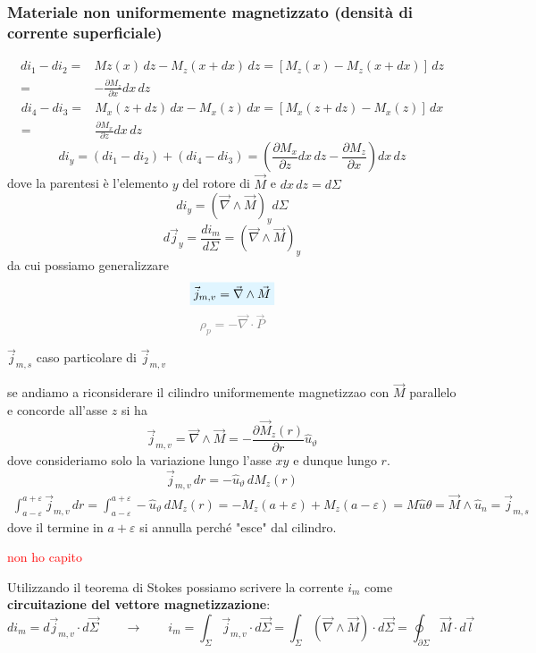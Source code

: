 \documentclass[x11names]{report}
\newcommand{\esempio}[2]{
	\begin{es}{#1}
		#2
	\end{es}
}
\newcommand{\viola}[1]{%
	\colorbox{myblue}{$\displaystyle #1$}
}
\begin{document}
\subsubsection{Materiale non uniformemente magnetizzato (densità di corrente superficiale)}
\begin{align*}
	di_1 - di_2 =& Mz(x)\, dz - M_z(x+dx)\, dz = \left[M_z(x) - M_z(x+dx)\right]\, dz \\
	 =& -\frac{\partial M_z}{\partial x} dx \, dz
\end{align*}
\begin{align*}
	di_4 - di_3 =& M_x(z+dz)\, dx - M_x(z)\, dx  = \left[M_x(z+dz) - M_x(z)\right]\, dx \\
	=& \frac{\partial M_x}{\partial z} dx \, dz
\end{align*}
\[
di_y = (di_1 - di_2) + (di_4 - di_3) = \left(\frac{\partial M_x}{\partial z} dx \, dz -\frac{\partial M_z}{\partial x}\right) dx \, dz 
\]
dove la parentesi è l'elemento \(y\) del rotore di \(\vec{M}\) e \(dx \, dz = d\Sigma\)
\[
di_y = \left(\vec{\nabla} \wedge \vec{M} \right)_y d\Sigma
\]
\[
d\vec{j}_y = \frac{di_m}{d\Sigma} =  \left(\vec{\nabla} \wedge \vec{M} \right)_y 
\]
da cui possiamo generalizzare 
\begin{equation}
	\viola{\vec{j}_{m,v} =  \vec{\nabla} \wedge \vec{M} }
\end{equation}
\vspace{-0.3cm}
\textcolor{gray}{\[
	\rho_p = - \vec{\nabla}\cdot \vec{P}
	\]}
\esempio{\(\vec{j}_{m,s}\) caso particolare di \(\vec{j}_{m,v}\)}{
se andiamo a riconsiderare il cilindro uniformemente magnetizzao con \(\vec{M}\) parallelo e concorde all'asse \(z\) si ha
\[
\vec{j}_{m,v} = \vec{\nabla} \wedge \vec{M} = - \frac{\partial \vec{M}_z(r)}{\partial r}\hat{u}_\vartheta
\]
dove consideriamo solo la variazione lungo l'asse \(xy\) e dunque lungo \(r\).
\[
\vec{j}_{m,v} \, dr = - \hat{u}_\vartheta \, dM_z(r) 
\]
\begin{gather*}
	\int_{a-\varepsilon}^{a+\varepsilon} \vec{j}_{m,v} \, dr  = \int_{a-\varepsilon}^{a+\varepsilon}-\hat{u}_\vartheta \, dM_z(r) = -M_z(a+\varepsilon) + M_z(a-\varepsilon) = M\hat{u}\theta = \vec{M}\wedge\hat{u}_n = \vec{j}_{m,s}
\end{gather*}
dove il  termine in \(a+\varepsilon\) si annulla perché "esce" dal cilindro.
\begin{center}
	\textcolor{red}{non ho capito}
\end{center}}
Utilizzando il teorema di Stokes possiamo scrivere la corrente \(i_m\) come \textbf{circuitazione del vettore magnetizzazione}:
\[
di_m = d\vec{j}_{m,v} \cdot d\vec{\Sigma} \qquad \to \qquad i_m = \int_\Sigma \vec{j}_{m,v} \cdot d\vec{\Sigma} = \int_\Sigma \left(\vec{\nabla}\wedge\vec{M}\right) \cdot d\vec{\Sigma} = \oint_{\partial\Sigma} \vec{M}\cdot d\vec{l}
\]
\end{document}
